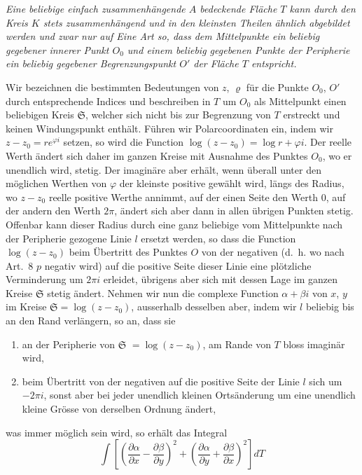 \documentclass[12pt,a4paper]{article}
\begin{document}
\medskip
\noindent\textit{Eine beliebige einfach zusammenhängende $A$ bedeckende Fläche $T$ kann durch den Kreis $K$ stets zusammenhängend und in den kleinsten Theilen ähnlich abgebildet werden und zwar nur auf Eine Art so, dass dem Mittelpunkte ein beliebig gegebener innerer Punkt $O_0$ und einem beliebig gegebenen Punkte der Peripherie ein beliebig gegebener Begrenzungspunkt $O'$ der Fläche $T$ entspricht.}
\medskip

Wir bezeichnen die bestimmten Bedeutungen von $z$, $\varrho$ für die Punkte $O_0$, $O'$ durch entsprechende Indices und beschreiben in $T$ um $O_0$ als Mittelpunkt einen beliebigen Kreis $\mathfrak{S}$, welcher sich nicht bis zur Begrenzung von $T$ erstreckt und keinen Windungspunkt enthält. Führen wir Polarcoordinaten ein, indem wir $z - z_0 = re^{\varphi i}$ setzen, so wird die Function $\log(z - z_0) = \log r + \varphi i$. Der reelle Werth ändert sich daher im ganzen Kreise mit Ausnahme des Punktes $O_0$, wo er unendlich wird, stetig. Der imaginäre aber erhält, wenn überall unter den möglichen Werthen von $\varphi$ der kleinste positive gewählt wird, längs des Radius, wo $z - z_0$ reelle positive Werthe annimmt, auf der einen Seite den Werth $0$, auf der andern den Werth $2\pi$, ändert sich aber dann in allen übrigen Punkten stetig. Offenbar kann dieser Radius durch eine ganz beliebige vom Mittelpunkte nach der Peripherie gezogene Linie $l$ ersetzt werden, so dass die Function $\log(z - z_0)$ beim Übertritt des Punktes $O$ von der negativen (d.~h. wo nach Art.~8 $p$ negativ wird) auf die positive Seite dieser Linie eine plötzliche Verminderung um $2\pi i$ erleidet, übrigens aber sich mit dessen Lage im ganzen Kreise $\mathfrak{S}$ stetig ändert. Nehmen wir nun die complexe Function $\alpha + \beta i$ von $x$, $y$ im Kreise $\mathfrak{S} = \log(z - z_0)$, ausserhalb desselben aber, indem wir $l$ beliebig bis an den Rand verlängern, so an, dass sie
\begin{enumerate}
\item an der Peripherie von $\mathfrak{S}$ $= \log(z - z_0)$, am Rande von $T$ bloss imaginär wird,
\item beim Übertritt von der negativen auf die positive Seite der Linie $l$ sich um $-2\pi i$, sonst aber bei jeder unendlich kleinen Ortsänderung um eine unendlich kleine Grösse von derselben Ordnung ändert,
\end{enumerate}
was immer möglich sein wird, so erhält das Integral
\[
\int \left[\left(\frac{\partial \alpha}{\partial x} - \frac{\partial \beta}{\partial y}\right)^2 + \left(\frac{\partial \alpha}{\partial y} + \frac{\partial \beta}{\partial x}\right)^2\right] dT
\]
\end{document}
